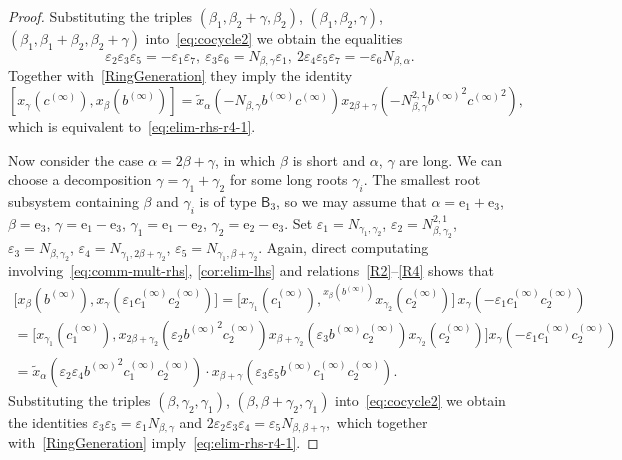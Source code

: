 \documentclass{article}
\numberwithin{equation}{section}
\theoremstyle{definition}
\theoremstyle{remark}
\newcommand{\up}[2]{{^{#1}\!{#2}}}
\newcommand{\rB}{\mathsf{B}}
\begin{document}
\begin{proof}
Substituting the triples $(\beta_1, \beta_2+\gamma, \beta_2)$, $(\beta_1, \beta_2, \gamma)$, $(\beta_1, \beta_1+\beta_2, \beta_2+\gamma)$ into~\eqref{eq:cocycle2} we obtain the equalities \[\varepsilon_2 \varepsilon_3 \varepsilon_5 = - \varepsilon_1 \varepsilon_7,\ \varepsilon_3 \varepsilon_6  = N_{\beta, \gamma}\varepsilon_1,\ 2 \varepsilon_4 \varepsilon_5 \varepsilon_7 = - \varepsilon_6 N_{\beta,\alpha}.\] Together with~\cref{RingGeneration} they imply the identity \[[x_\gamma(c^{(\infty)}), x_\beta(b^{(\infty)})] = 
 \widetilde{x}_\alpha(-N_{\beta, \gamma} b^{(\infty)} c^{(\infty)}) x_{2\beta+\gamma}(-N_{\beta,\gamma}^{2,1} {b^{(\infty)}}^2 {c^{(\infty)}}^2),\] which is equivalent to~\eqref{eq:elim-rhs-r4-1}. 
 
 Now consider the case \(\alpha = 2\beta + \gamma\), in which \(\beta\) is short and \(\alpha\), \(\gamma\) are long. We can choose a decomposition \(\gamma = \gamma_1 + \gamma_2\) for some long roots \(\gamma_i\). The smallest root subsystem containing \(\beta\) and \(\gamma_i\) is of type \(\rB_3\), so we may assume that \(\alpha = \mathrm e_1 + \mathrm e_3\), \(\beta = \mathrm e_3\), \(\gamma = \mathrm e_1 - \mathrm e_3\), \(\gamma_1 = \mathrm e_1 - \mathrm e_2\), \(\gamma_2 = \mathrm e_2 - \mathrm e_3\). Set $\varepsilon_1 = N_{\gamma_1, \gamma_2}$, $\varepsilon_2 = N_{\beta,\gamma_2}^{2,1}$, $\varepsilon_3 = N_{\beta,\gamma_2}$, $\varepsilon_4 = N_{\gamma_1, 2\beta+\gamma_2}$, $\varepsilon_5 = N_{\gamma_1, \beta+\gamma_2}$.
 Again, direct computating involving~\eqref{eq:comm-mult-rhs}, \cref{cor:elim-lhs} and relations~\eqref{R2}--\eqref{R4} shows that
 \begin{multline*}
  \bigl[x_\beta(b^{(\infty)}), x_\gamma(\varepsilon_1 c_1^{(\infty)} c_2^{(\infty)})\bigr]
   =  \bigl[x_{\gamma_1}(c_1^{(\infty)}), \up{x_\beta(b^{(\infty)})} {x_{\gamma_2}(c_2^{(\infty)})}\bigr]\,
  x_\gamma(-\varepsilon_1 c_1^{(\infty)} c_2^{(\infty)}) \\  
  = \bigl[x_{\gamma_1}(c_1^{(\infty)}), x_{2\beta+\gamma_2}(\varepsilon_2 {b^{(\infty)}}^2 c_2^{(\infty)}) x_{\beta+\gamma_2}(\varepsilon_3 b^{(\infty)} c_2^{(\infty)}) x_{\gamma_2}(c_2^{(\infty)})\bigr] x_\gamma(-\varepsilon_1 c_1^{(\infty)} c_2^{(\infty)}) \\
  = \widetilde{x}_\alpha( \varepsilon_2 \varepsilon_4 {b^{(\infty)}}^2 c_1^{(\infty)}c_2^{(\infty)}) \cdot x_{\beta+\gamma}(\varepsilon_3 \varepsilon_5 b^{(\infty)} c_1^{(\infty)}c_2^{(\infty)}). \end{multline*}
 Substituting the triples $(\beta, \gamma_2, \gamma_1)$, $(\beta, \beta+\gamma_2, \gamma_1)$ into~\eqref{eq:cocycle2} we obtain the identities $\varepsilon_3 \varepsilon_5 = \varepsilon_1 N_{\beta,\gamma}$ and
 $2\varepsilon_2\varepsilon_3 \varepsilon_4 = \varepsilon_5N_{\beta,\beta+\gamma},$ which together with~\cref{RingGeneration} imply~\eqref{eq:elim-rhs-r4-1}. \end{proof}
\end{document}
